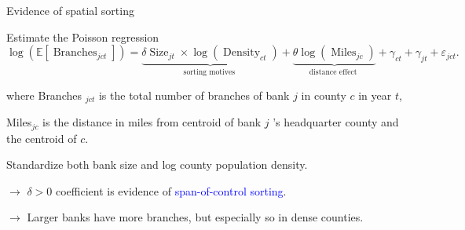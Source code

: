 \documentclass[notes,10pt, aspectratio=169]{beamer}
\newenvironment{wideitemize}{\itemize\addtolength{\itemsep}{10pt}}{\enditemize}
\begin{document}
    \begin{frame}{Evidence of spatial sorting}
    
\begin{wideitemize}
    \item Estimate the Poisson regression
$$
\log \left(\mathbb{E}\left[\operatorname{Branches}_{j c t}\right]\right)=\underbrace{\delta \operatorname{Size}_{j t} \times \log \left(\operatorname{Density}_{c t}\right)}_{\text {sorting motives }}+\underbrace{\theta \log \left(\operatorname{Miles}_{j c}\right)}_{\text {distance effect }}+\gamma_{c t}+\gamma_{j t}+\varepsilon_{j c t} .
$$

\begin{wideitemize}
    \item where Branches $_{j c t}$ is the total number of branches of bank $j$ in county $c$ in year $t$,
    \item Miles${ }_{j c}$ is the distance in miles from centroid of bank $j$ 's headquarter county and the centroid of $c$. 
    \item Standardize both bank size and log county population density.
    


\end{wideitemize}

\item[$\rightarrow$] $\delta>0$ coefficient is evidence of \textcolor{blue}{span-of-control sorting}.
\item[$\rightarrow$] Larger banks have more branches, but especially so in dense counties.

\end{wideitemize}
    \end{frame}
\end{document}
